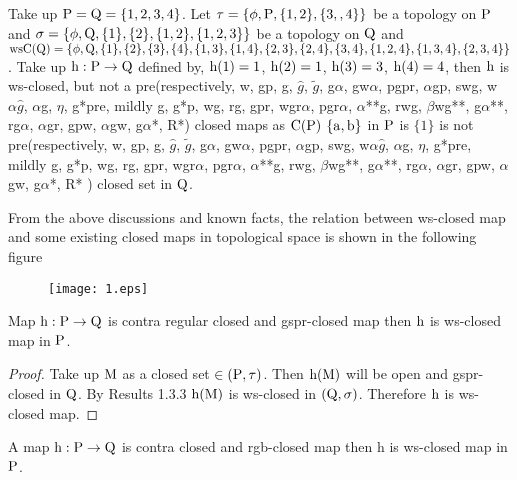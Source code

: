 \begin{exm}\label{exam4.2.13}
Take up $\mathrm{P}=\mathrm{Q}= \{1, 2, 3, 4\}$. Let $\tau= \{\phi, \mathrm{P}, \{1,2\}, \{3,,4 \}\}$ be a topology on $\mathrm{P}$ and $\sigma=\{\phi, \mathrm{Q}, \{1\}, \{2\}, \{1,2\},\{1,2,3\}\}$ be a topology on $\mathrm{Q}$ and $\ws\TSC(\TSQ)=\{\phi, \TSQ, \{1\},\{2\},\{3\},\{4\},\{1,3\}, \{1,4\},\{2,3\},\{2,4\},\{3,4\},\{1,2,4\},\break \{1,3,4\}, \{2,3,4\}\}$. Take up $\mathrm{h}: \mathrm{P} \to \mathrm{Q}$ defined by, $\mathrm{h}(1) = 1$, $\mathrm{h}(2) = 1$, $\mathrm{h}(3) = 3$, $\mathrm{h}(4)=4$, then $\mathrm{h}$ is ws-closed, but not a pre(respectively, w, gp, g, $\hat{g}$, $\tilde{g}$, g$\alpha$, gw$\alpha$, pgpr, $\alpha$gp, swg, w$\alpha\hat{g}$, $\alpha$g, $\eta$, g*pre, mildly g, g*p, wg, rg, gpr, wgr$\alpha$, pgr$\alpha$, $\alpha$**g, rwg, $\beta$wg**, g$\alpha$**, rg$\alpha$, $\alpha$gr, gpw, $\alpha$gw, g$\alpha$*, R*) closed maps as $\mathrm{C}(\mathrm{P})$ $\{\mathrm{a} , \mathrm{b}\}$ in $\mathrm{P}$ is $\{1\}$ is not pre(respectively, w, gp, g, $\hat{g}$, $\tilde{g}$, g$\alpha$, gw$\alpha$, pgpr, $\alpha$gp, swg, w$\alpha\hat{g}$, $\alpha$g, $\eta$, g*pre, mildly g, g*p, wg, rg, gpr, wgr$\alpha$, pgr$\alpha$, $\alpha$**g, rwg, $\beta$wg**, g$\alpha$**, rg$\alpha$, $\alpha$gr, gpw, $\alpha$gw, g$\alpha$*, R* ) closed set in $\mathrm{Q}$.
\end{exm}

\begin{rem}\label{rem4.2.14}
From the above discussions and known facts, the relation between ws-closed map and some existing closed maps in topological space is shown in the following figure
\begin{figure}[!ht]
\centering
\texttt{[image: 1.eps]}
\end{figure}
\end{rem}

\begin{thm}\label{thm4.2.15}
Map $\mathrm{h}: \mathrm{P} \to \mathrm{Q}$ is contra regular closed and gspr-closed map then $\mathrm{h}$ is ws-closed map in $\mathrm{P}$.
\end{thm}

\begin{proof}
Take up $\mathrm{M}$ as a closed set $\in (\mathrm{P}, \tau)$. Then $\mathrm{h} (\mathrm{M})$ will be open and gspr-closed in $\mathrm{Q}$. By Results 1.3.3 $\mathrm{h} (\mathrm{M})$ is ws-closed in $(\mathrm{Q}, \sigma)$. Therefore $\mathrm{h}$ is ws-closed map.
\end{proof}

\begin{thm}\label{thm4.2.16}
A map $\mathrm{h}: \mathrm{P} \to \mathrm{Q}$ is contra closed and rgb-closed map then h is ws-closed map in $\mathrm{P}$.
\end{thm}

